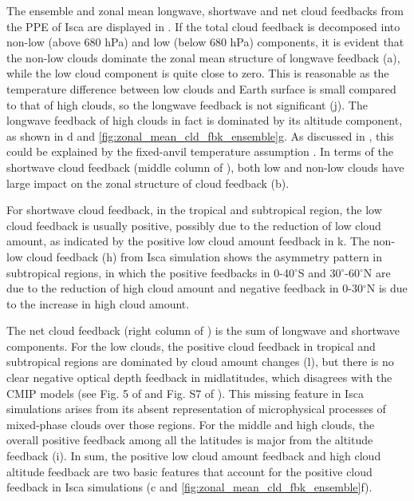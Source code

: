 The ensemble and zonal mean longwave, shortwave and net cloud feedbacks from the PPE of Isca are displayed in . If the total cloud feedback is decomposed into non-low (above 680 hPa) and low (below 680 hPa) components, it is evident that the non-low clouds dominate the zonal mean structure of longwave feedback (a), while the low cloud component is quite close to zero. This is reasonable as the temperature difference between low clouds and Earth surface is small compared to that of high clouds, so the longwave feedback is not significant (j). The longwave feedback of high clouds in fact is dominated by its altitude component, as shown in d and \ref{fig:zonal_mean_cld_fbk_ensemble}g. As discussed in , this could be explained by the fixed-anvil temperature assumption \citep{Hartmann2002FAT}. In terms of the shortwave cloud feedback (middle column of ), both low and non-low clouds have large impact on the zonal structure of cloud feedback (b). 

For shortwave cloud feedback, in the tropical and subtropical region, the low cloud feedback is usually positive, possibly due to the reduction of low cloud amount, as indicated by the positive low cloud amount feedback in k. The non-low cloud feedback (h) from Isca simulation shows the asymmetry pattern in subtropical regions, in which the positive feedbacks in 0-40$^\circ$S and 30$^\circ$-60$^\circ$N are due to the reduction of high cloud amount  and negative feedback in 0-30$^\circ$N is due to the increase in high cloud amount. 

The net cloud feedback (right column of ) is the sum of longwave and shortwave components. For the low clouds, the positive cloud feedback in tropical and subtropical regions are dominated by cloud amount changes (l), but there is no clear negative optical depth feedback in midlatitudes, which disagrees with the CMIP models (see Fig. 5 of \citealt{Sherwood2020} and Fig. S7 of \citealt{Zelinka2016insights}). This missing feature in Isca simulations arises from its absent representation of microphysical processes of mixed-phase clouds over those regions. For the middle and high clouds, the overall positive feedback among all the latitudes is major from the altitude feedback (i). In sum, the positive low cloud amount feedback and high cloud altitude feedback are two basic features that account for the positive cloud feedback in Isca simulations (c and \ref{fig:zonal_mean_cld_fbk_ensemble}f).

